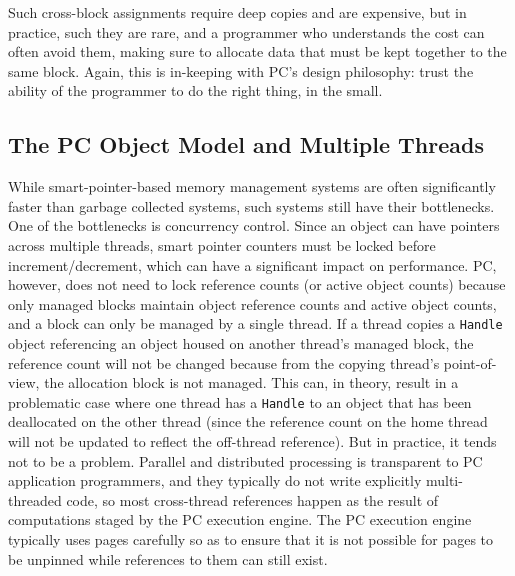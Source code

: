 Such cross-block assignments require deep copies and are expensive,
but in practice, such they are rare, and a programmer who understands the cost can often avoid them, making sure to allocate
data that must be kept together to the same block.
Again, this is in-keeping with PC's design philosophy: trust the ability of the programmer to do the right thing, in the small.

\subsection{The PC Object Model and Multiple Threads}

While smart-pointer-based memory management
systems are often significantly faster than garbage collected systems, such systems still have their bottlenecks.  One of the bottlenecks is concurrency
control.
Since an object can have pointers across multiple threads, smart pointer counters must be locked before increment/decrement, which
can have a significant impact on performance.  PC, however, does not need to lock reference counts (or active object counts) because only managed blocks maintain
object reference counts and active object counts,
and a block can only be managed by a single thread.  
If a thread copies a \texttt{Handle} object referencing an object housed on another thread's managed block, 
the reference count will not be changed because from the copying thread's point-of-view, the allocation block is not managed.
This can, in theory, result in a problematic case where one thread has a \texttt{Handle} to an object that has been deallocated on the other thread (since
the reference count on the home thread will not be updated to reflect
the off-thread reference).  But in practice, it tends not to be a
problem.  Parallel and distributed processing is transparent to PC application
programmers, and they typically do not write explicitly multi-threaded code, so most cross-thread references happen as the result of computations staged by the 
PC execution engine.  The PC execution engine typically uses pages carefully so as to ensure that 
it is not possible for pages to be unpinned while references to them can still exist.


